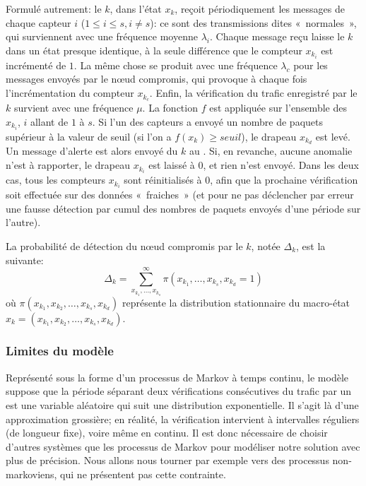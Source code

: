 \bigskip
Formulé autrement: le \cn $k$, dans l'état $x_k$, reçoit périodiquement les messages de chaque capteur $i$ ($1\leq i\leq s, i\!\neq\!s$): ce sont des transmissions dites «~normales~», qui surviennent avec une fréquence moyenne $\lambda_i$.
Chaque message reçu laisse le \cn $k$ dans un état presque identique, à la seule différence que le compteur $x_{k_i}$ est incrémenté de $1$.
La même chose se produit avec une fréquence $\lambda_c$ pour les messages envoyés par le nœud compromis, qui provoque à chaque fois l'incrémentation du compteur $x_{k_c}$.
Enfin, la vérification du trafic enregistré par le \cn $k$ survient avec une fréquence $\mu$.
La fonction $f$ est appliquée sur l'ensemble des $x_{k_i}$, $i$ allant de $1$ à $s$.
Si l'un des capteurs a envoyé un nombre de paquets supérieur à la valeur de seuil (\cad si l'on a $f(x_k)\geq \mathit{seuil}$), le drapeau $x_{k_d}$ est levé.
Un message d'alerte est alors envoyé du \cn $k$ au \ch.
Si, en revanche, aucune anomalie n'est à rapporter, le drapeau $x_{k_i}$ est laissé à $0$, et rien n'est envoyé.
Dans les deux cas, tous les compteurs $x_{k_i}$ sont réinitialisés à $0$, afin que la prochaine vérification soit effectuée sur des données «~fraiches~» (et pour ne pas déclencher par erreur une fausse détection par cumul des nombres de paquets envoyés d'une période sur l'autre).

La probabilité de détection du nœud compromis par le \cn $k$, notée $\Delta_k$, est la suivante:
\[\Delta_k=\sum_{x_{k_1},\dots,x_{k_s}}^\infty\pi(x_{k_1},\dots,x_{k_s},x_{k_d}=1)\]
où $\pi(x_{k_1},x_{k_2},\dots,x_{k_{s}},x_{k_d})$ représente la distribution stationnaire du macro-état $x_k\!=\!(x_{k_1},x_{k_2},\dots,x_{k_{s}},x_{k_d})$.

        \subsubsection{Limites du modèle}
Représenté sous la forme d'un processus de Markov à temps continu, le modèle suppose que la période séparant deux vérifications consécutives du trafic par un \cn est une variable aléatoire qui suit une distribution exponentielle.
Il s'agit là d'une approximation grossière; en réalité, la vérification intervient à intervalles réguliers (de longueur fixe), voire même en continu.
Il est donc nécessaire de choisir d'autres systèmes que les processus de Markov pour modéliser notre solution avec plus de précision.
Nous allons nous tourner par exemple vers des processus non-markoviens, qui ne présentent pas cette contrainte.

